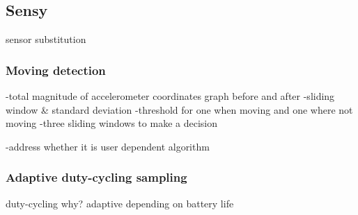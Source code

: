 \subsection{Sensy}
\label{s:design:sensy}

sensor substitution

\subsubsection{Moving detection}
\label{s:design:moving}
-total magnitude of accelerometer coordinates		graph before and after
-sliding window \& standard deviation
	-threshold			for one when moving and one where not moving
-three sliding windows to make a decision

-address whether it is user dependent algorithm

\subsubsection{Adaptive duty-cycling sampling}
\label{s:design:sensy:adaptive}
duty-cycling
		why?
adaptive depending on battery life

